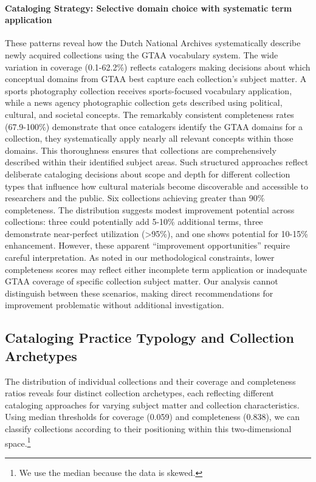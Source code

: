 \documentclass[final]{anthology-ch}
\begin{document}
\paragraph{Cataloging Strategy: Selective domain choice with systematic term application} These patterns reveal how the Dutch National Archives systematically describe newly acquired collections using the GTAA vocabulary system. The wide variation in coverage (0.1-62.2\%) reflects catalogers making decisions about which conceptual domains from GTAA best capture each collection's subject matter. A sports photography collection receives sports-focused vocabulary application, while a news agency photographic collection gets described using political, cultural, and societal concepts. 
The remarkably consistent completeness rates (67.9-100\%) demonstrate that once catalogers identify the GTAA domains for a collection, they systematically apply nearly all relevant concepts within those domains. This thoroughness ensures that collections are comprehensively described within their identified subject areas. Such structured approaches reflect deliberate cataloging decisions about scope and depth for different collection types that influence how cultural materials become discoverable and accessible to researchers and the public. Six collections achieving greater than 90\% completeness. The distribution suggests modest improvement potential across collections: three could potentially add 5-10\% additional terms, three demonstrate near-perfect utilization (>95\%), and one shows potential for 10-15\% enhancement. 
However, these apparent ``improvement opportunities'' require careful interpretation. As noted in our methodological constraints, lower completeness scores may reflect either incomplete term application or inadequate GTAA coverage of specific collection subject matter. Our analysis cannot distinguish between these scenarios, making direct recommendations for improvement problematic without additional investigation. 


\subsection{Cataloging Practice Typology and Collection Archetypes}

The distribution of individual collections and their coverage and completeness ratios reveals four distinct collection archetypes, each reflecting different cataloging approaches for varying subject matter and collection characteristics. Using median thresholds for coverage (0.059) and completeness (0.838), we can classify collections according to their positioning within this two-dimensional space.\footnote{We use the median because the data is skewed.}
\end{document}
